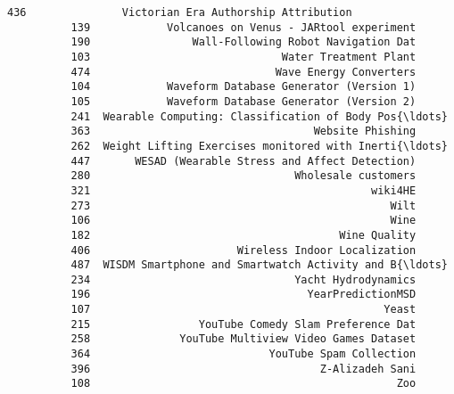\documentclass[11pt]{article}
\begin{document}
\begin{Verbatim}[commandchars=\\\{\}]
          436               Victorian Era Authorship Attribution   
          139            Volcanoes on Venus - JARtool experiment   
          190                Wall-Following Robot Navigation Dat   
          103                              Water Treatment Plant   
          474                             Wave Energy Converters   
          104            Waveform Database Generator (Version 1)   
          105            Waveform Database Generator (Version 2)   
          241  Wearable Computing: Classification of Body Pos{\ldots}   
          363                                   Website Phishing   
          262  Weight Lifting Exercises monitored with Inerti{\ldots}   
          447       WESAD (Wearable Stress and Affect Detection)   
          280                                Wholesale customers   
          321                                            wiki4HE   
          273                                               Wilt   
          106                                               Wine   
          182                                       Wine Quality   
          406                       Wireless Indoor Localization   
          487  WISDM Smartphone and Smartwatch Activity and B{\ldots}   
          234                                Yacht Hydrodynamics   
          196                                  YearPredictionMSD   
          107                                              Yeast   
          215                 YouTube Comedy Slam Preference Dat   
          258              YouTube Multiview Video Games Dataset   
          364                            YouTube Spam Collection   
          396                                    Z-Alizadeh Sani   
          108                                                Zoo   
          

\end{Verbatim}
\end{document}
